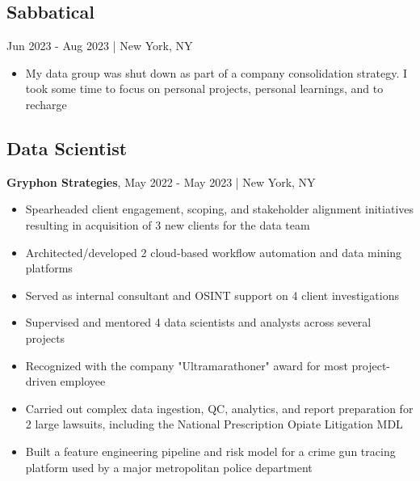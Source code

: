 \documentclass[11pt]{article}
\newenvironment{myitemize}
{ \begin{itemize}
	\setlength{\itemsep}{0pt}
	\setlength{\parskip}{0pt}
	\setlength{\parsep}{0pt}     }
{ \end{itemize}                  }
\begin{document}
\subsection*{Sabbatical}
\vspace{-3truemm}

{\bfseries}Jun 2023 - Aug 2023 | New York, NY
\begin{myitemize}
	\item My data group was shut down as part of a company consolidation strategy. I took some time to focus on personal projects, personal learnings, and to recharge
\end{myitemize}

\subsection*{Data Scientist}
\vspace{-3truemm}

{\bfseries Gryphon Strategies}, May 2022 - May 2023 | New York, NY
\begin{myitemize}
	\item Spearheaded client engagement, scoping, and stakeholder alignment initiatives resulting in acquisition of 3 new clients for the data team
	\item Architected/developed 2 cloud-based workflow automation and data mining platforms
	\item Served as internal consultant and OSINT support on 4 client investigations
	\item Supervised and mentored 4 data scientists and analysts across several projects
	\item Recognized with the company "Ultramarathoner" award for most project-driven employee


	\item Carried out complex data ingestion, QC, analytics, and report preparation for 2 large lawsuits, including the National Prescription Opiate Litigation MDL
	\item Built a feature engineering pipeline and risk model for a crime gun tracing platform used by a major metropolitan police department
\end{myitemize}
\end{document}
